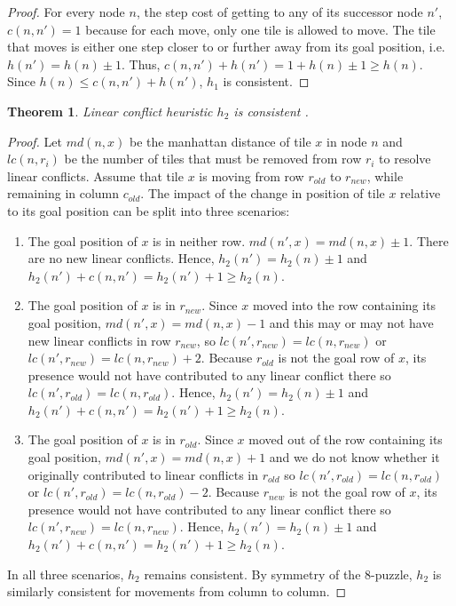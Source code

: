 \documentclass[11pt, a4paper]{article}
\newtheorem{theorem}{Theorem}
\theoremstyle{definition}
\begin{document}
\begin{proof}
  For every node $n$, the step cost of getting to any of its successor node $n'$, $c(n, n') = 1$ because for each move, only one tile is allowed to move. The tile that moves is either one step closer to or further away from its goal position, i.e. $h(n') = h(n) \pm 1$. Thus, $c(n, n') + h(n') = 1 + h(n) \pm 1 \geq h(n)$. Since $h(n) \leq c(n, n') + h(n')$, $h_1$ is consistent.
\end{proof}

\begin{theorem}
  Linear conflict heuristic $h_2$ is consistent \cite[p.~15]{hansson1985generating}.
\end{theorem}

\begin{proof}
  Let $md(n, x)$ be the manhattan distance of tile $x$ in node $n$ and $lc(n, r_i)$ be the number of tiles that must be removed from row $r_i$ to resolve linear conflicts.
  Assume that tile $x$ is moving from row $r_{old}$ to $r_{new}$, while remaining in column $c_{old}$. The impact of the change in position of tile $x$ relative to its goal position can be split into three scenarios:
  \begin{enumerate}
    \item The goal position of $x$ is in neither row. $md(n', x) = md(n, x) \pm 1$. There are no new linear conflicts. Hence, $h_2(n') = h_2(n) \pm 1$ and $h_2(n') + c(n, n') = h_2(n') + 1 \geq h_2(n)$.
    \item The goal position of $x$ is in $r_{new}$. Since $x$ moved into the row containing its goal position, $md(n', x) = md(n, x) - 1$ and this may or may not have new linear conflicts in row $r_{new}$, so $lc(n', r_{new}) = lc(n, r_{new})$ or $lc(n', r_{new}) = lc(n, r_{new}) + 2$. Because $r_{old}$ is not the goal row of $x$, its presence would not have contributed to any linear conflict there so $lc(n', r_{old}) = lc(n, r_{old})$. Hence, $h_2(n') = h_2(n) \pm 1$ and $h_2(n') + c(n, n') = h_2(n') + 1 \geq h_2(n)$.
    \item The goal position of $x$ is in $r_{old}$. Since $x$ moved out of the row containing its goal position, $md(n', x) = md(n, x) + 1$ and we do not know whether it originally contributed to linear conflicts in $r_{old}$ so $lc(n', r_{old}) = lc(n, r_{old})$ or $lc(n', r_{old}) = lc(n, r_{old}) - 2$. Because $r_{new}$ is not the goal row of $x$, its presence would not have contributed to any linear conflict there so $lc(n', r_{new}) = lc(n, r_{new})$. Hence, $h_2(n') = h_2(n) \pm 1$ and $h_2(n') + c(n, n') = h_2(n') + 1 \geq h_2(n)$.
  \end{enumerate}
  In all three scenarios, $h_2$ remains consistent. By symmetry of the 8-puzzle, $h_2$ is similarly consistent for movements from column to column.
\end{proof}
\end{document}
